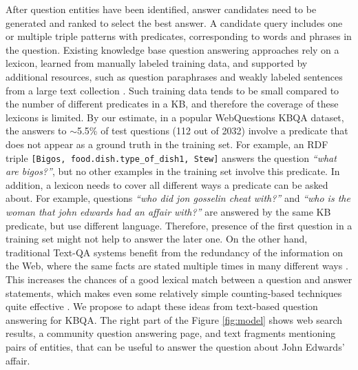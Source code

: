 After question entities have been identified, answer candidates need to be generated and ranked to select the best answer.
A candidate query includes one or multiple triple patterns with predicates, corresponding to words and phrases in the question.
Existing knowledge base question answering approaches \cite{ACCU:2015,Berant:EMNLP13,berant2014semantic,berant2015imitation,BordesCW14:emnlp,yao2014freebase} rely on a lexicon, learned from manually labeled training data, and supported by additional resources, such as question paraphrases \cite{berant2014semantic} and weakly labeled sentences from a large text collection \cite{yao2014information}.
Such training data tends to be small compared to the number of different predicates in a KB, and therefore the coverage of these lexicons is limited.
By our estimate, in a popular WebQuestions KBQA dataset, the answers to $\sim$5.5\% of test questions (112 out of 2032) involve a predicate that does not appear as a ground truth in the training set.
For example, an RDF triple \texttt{[Bigos, food.dish.type\_of\_dish1, Stew]} answers the question \textit{``what are bigos?''}, but no other examples in the training set involve this predicate.
In addition, a lexicon needs to cover all different ways a predicate can be asked about.
For example, questions \textit{``who did jon gosselin cheat with?''} and \textit{``who is the woman that john edwards had an affair with?''} are answered by the same KB predicate, but use different language.
Therefore, presence of the first question in a training set might not help to answer the later one.
On the other hand, traditional Text-QA systems benefit from the redundancy of the information on the Web, where the same facts are stated multiple times in many different ways \cite{Lin:2007:EPU:1229179.1229180}.
This increases the chances of a good lexical match between a question and answer statements, which makes even some relatively simple counting-based techniques quite effective \cite{brill2002analysis}.
We propose to adapt these ideas from text-based question answering for KBQA.
The right part of the Figure \ref{fig:model} shows web search results, a community question answering page, and text fragments mentioning pairs of entities, that can be useful to answer the question about John Edwards' affair.

